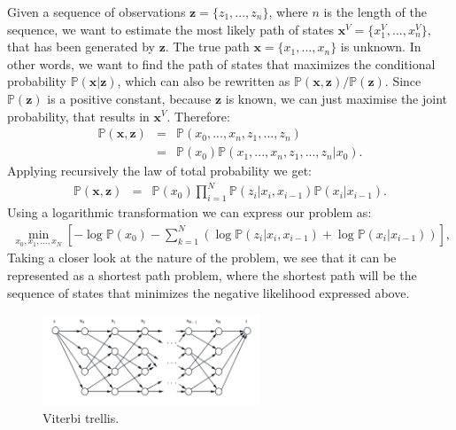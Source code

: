 \documentclass[a4paper, 11pt]{article} %
\begin{document}
Given a sequence of observations $\textbf{z} = \{ z_{1},..., z_{n} \}$, where $n$ is the length of the sequence, we want to estimate the most likely path of states $\textbf{x}^V = \{ x_{1}^V, ..., x_{n}^V \}$, that has been generated by $\textbf{z}$. The true path $\textbf{x} = \{ x_{1}, ..., x_{n} \}$ is unknown. In other words, we want to find the path of states that maximizes the conditional probability $\mathbb{P}(\textbf{x} | \textbf{z})$, which can also be rewritten as $\mathbb{P}(\textbf{x},\textbf{z})/\mathbb{P}(\textbf{z})$. Since $\mathbb{P}(\textbf{z})$ is a positive constant, because $\textbf{z}$ is known, we can just maximise the joint probability, that results in $\textbf{x}^V$. Therefore:
\begin{eqnarray}
\mathbb{P}(\textbf{x}, \textbf{z}) &=& \mathbb{P}(x_{0},...,x_{n},z_{1},...,z_{n})  \nonumber \\
&=& \mathbb{P}(x_{0})\mathbb{P}(x_{1},...,x_{n},z_{1},...,z_{n} | x_{0}).  \nonumber
\end{eqnarray}
Applying recursively the law of total probability we get:
\begin{eqnarray}
\mathbb{P}(\textbf{x}, \textbf{z}) &=& \mathbb{P}(x_{0}) \prod^{N}_{i=1} \mathbb{P}(z_i | x_i, x_{i-1}) \mathbb{P}(x_i | x_{i-1}).   \nonumber
\end{eqnarray}
Using a logarithmic transformation we can express our problem as:
\begin{eqnarray}
\min_{x_0, x_1, \dots, x_N} \left[ -\log \mathbb{P}(x_{0}) - \sum^{N}_{k=1} \left( \log \mathbb{P}(z_i | x_i, x_{i-1}) + \log \mathbb{P}(x_i | x_{i-1}) \right) \right],  \nonumber
\end{eqnarray}
Taking a closer look at the nature of the problem, we see that it can be represented as a shortest path problem, where the shortest path will be the sequence of states that minimizes the negative likelihood expressed above.

\begin{figure} %
\begin{center}
\includegraphics[width=0.58\textwidth]{trellis.png}
\end{center}
\caption{Viterbi trellis.}
\end{figure}
\end{document}
